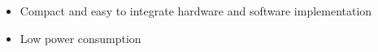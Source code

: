 %

\begin{itemize}
  \itemsep-0.5em
  \item Compact and easy to integrate hardware and software implementation
  \item Low power consumption
\end{itemize}
